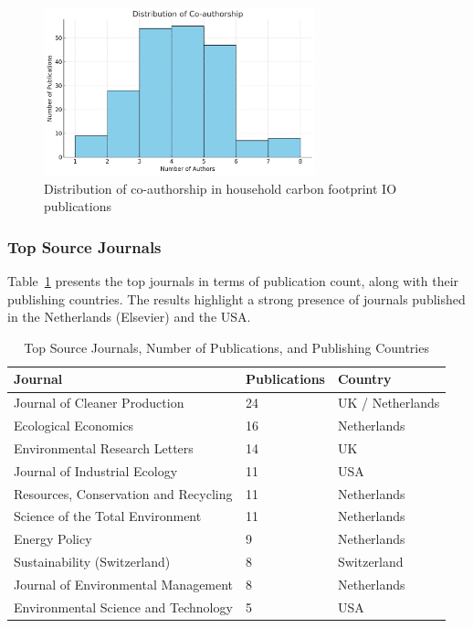 \documentclass[12pt,a4paper]{article}%
\begin{document}
\begin{figure}[h]
\centering
\includegraphics[width=0.7\textwidth]{Coauthors.png}
\caption{Distribution of co-authorship in household carbon footprint IO publications}
\label{fig:coauthorship}
\end{figure}

\subsubsection{Top Source Journals}

Table~\ref{tab:journal_countries} presents the top journals in terms of publication count, along with their publishing countries. The results highlight a strong presence of journals published in the Netherlands (Elsevier) and the USA.

\begin{table}[h]
\centering
\caption{Top Source Journals, Number of Publications, and Publishing Countries}
\label{tab:journal_countries}
\begin{tabular}{lll}
\hline
\textbf{Journal} & \textbf{Publications} & \textbf{Country} \\
\hline
Journal of Cleaner Production & 24 & UK / Netherlands \\
Ecological Economics & 16 & Netherlands \\
Environmental Research Letters & 14 & UK \\
Journal of Industrial Ecology & 11 & USA \\
Resources, Conservation and Recycling & 11 & Netherlands \\
Science of the Total Environment & 11 & Netherlands \\
Energy Policy & 9 & Netherlands \\
Sustainability (Switzerland) & 8 & Switzerland \\
Journal of Environmental Management & 8 & Netherlands \\
Environmental Science and Technology & 5 & USA \\
\hline
\end{tabular}
\end{table}
\end{document}

